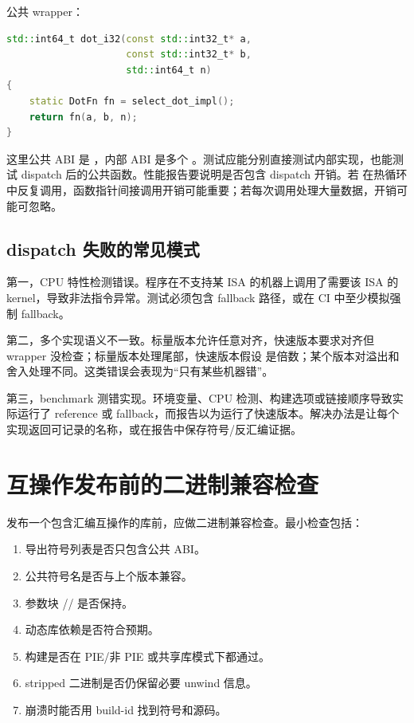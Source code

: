 公共 wrapper：

\begin{lstlisting}[language=C++]
std::int64_t dot_i32(const std::int32_t* a,
                     const std::int32_t* b,
                     std::int64_t n)
{
    static DotFn fn = select_dot_impl();
    return fn(a, b, n);
}
\end{lstlisting}

这里公共 ABI 是 ，内部 ABI 是多个 。测试应能分别直接测试内部实现，也能测试 dispatch 后的公共函数。性能报告要说明是否包含 dispatch 开销。若  在热循环中反复调用，函数指针间接调用开销可能重要；若每次调用处理大量数据，开销可能可忽略。

\subsection{dispatch 失败的常见模式}

第一，CPU 特性检测错误。程序在不支持某 ISA 的机器上调用了需要该 ISA 的 kernel，导致非法指令异常。测试必须包含 fallback 路径，或在 CI 中至少模拟强制 fallback。

第二，多个实现语义不一致。标量版本允许任意对齐，快速版本要求对齐但 wrapper 没检查；标量版本处理尾部，快速版本假设  是倍数；某个版本对溢出和舍入处理不同。这类错误会表现为“只有某些机器错”。

第三，benchmark 测错实现。环境变量、CPU 检测、构建选项或链接顺序导致实际运行了 reference 或 fallback，而报告以为运行了快速版本。解决办法是让每个实现返回可记录的名称，或在报告中保存符号/反汇编证据。

\section{互操作发布前的二进制兼容检查}

发布一个包含汇编互操作的库前，应做二进制兼容检查。最小检查包括：

\begin{enumerate}
  \item 导出符号列表是否只包含公共 ABI。
  \item 公共符号名是否与上个版本兼容。
  \item 参数块 // 是否保持。
  \item 动态库依赖是否符合预期。
  \item 构建是否在 PIE/非 PIE 或共享库模式下都通过。
  \item stripped 二进制是否仍保留必要 unwind 信息。
  \item 崩溃时能否用 build-id 找到符号和源码。
\end{enumerate}

